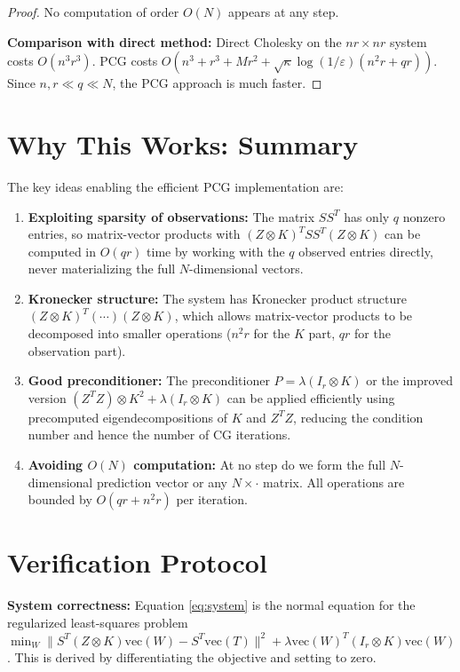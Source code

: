 \documentclass[12pt]{article}
\begin{document}
\begin{proof}
No computation of order $O(N)$ appears at any step.

\textbf{Comparison with direct method:} Direct Cholesky on the $nr \times nr$ system costs $O(n^3 r^3)$. PCG costs $O(n^3 + r^3 + Mr^2 + \sqrt{\kappa}\log(1/\varepsilon)(n^2 r + qr))$. Since $n,r \ll q \ll N$, the PCG approach is much faster.

\end{proof}

\section{Why This Works: Summary}

The key ideas enabling the efficient PCG implementation are:

\begin{enumerate}
\item \textbf{Exploiting sparsity of observations:} The matrix $SS^T$ has only $q$ nonzero entries, so matrix-vector products with $(Z\otimes K)^T SS^T (Z\otimes K)$ can be computed in $O(qr)$ time by working with the $q$ observed entries directly, never materializing the full $N$-dimensional vectors.

\item \textbf{Kronecker structure:} The system has Kronecker product structure $(Z\otimes K)^T (\cdots)(Z\otimes K)$, which allows matrix-vector products to be decomposed into smaller operations ($n^2 r$ for the $K$ part, $qr$ for the observation part).

\item \textbf{Good preconditioner:} The preconditioner $P = \lambda(I_r \otimes K)$ or the improved version $(Z^TZ)\otimes K^2 + \lambda(I_r \otimes K)$ can be applied efficiently using precomputed eigendecompositions of $K$ and $Z^TZ$, reducing the condition number and hence the number of CG iterations.

\item \textbf{Avoiding $O(N)$ computation:} At no step do we form the full $N$-dimensional prediction vector or any $N \times \cdot$ matrix. All operations are bounded by $O(qr + n^2 r)$ per iteration.
\end{enumerate}

\section{Verification Protocol}

\textbf{System correctness:} Equation \eqref{eq:system} is the normal equation for the regularized least-squares problem $\min_W \|S^T(Z\otimes K)\mathrm{vec}(W) - S^T\mathrm{vec}(T)\|^2 + \lambda\mathrm{vec}(W)^T(I_r\otimes K)\mathrm{vec}(W)$. This is derived by differentiating the objective and setting to zero.
\end{document}

